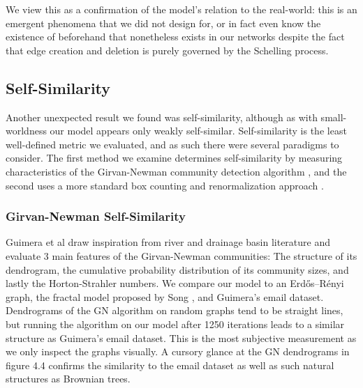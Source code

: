 \documentclass[12pt,twoside]{report}
\begin{document}
We view this as a confirmation of the model's relation to the real-world: this is an emergent phenomena that we did not design for, or in fact even know the existence of beforehand that nonetheless exists in our networks despite the fact that edge creation and deletion is purely governed by the Schelling process. \\

\subsection{Self-Similarity}

Another unexpected result we found was self-similarity, although as with small-worldness our model appears only weakly self-similar. Self-similarity is the least well-defined metric we evaluated, and as such there were several paradigms to consider. The first method we examine determines self-similarity by measuring characteristics of the Girvan-Newman community detection algorithm \cite{guimera2002self}, and the second uses a more standard box counting and renormalization approach \cite{song2007calculate}. \\

\subsubsection{Girvan-Newman Self-Similarity}

Guimera et al \cite{guimera2002self} draw inspiration from river and drainage basin literature and evaluate 3 main features of the Girvan-Newman communities: The structure of its dendrogram, the cumulative probability distribution of its community sizes, and lastly the Horton-Strahler numbers. We compare our model to an Erdős–Rényi graph, the fractal model proposed by Song \cite{song2006origins}, and Guimera's email dataset. \\

Dendrograms of the GN algorithm on random graphs tend to be straight lines, but running the algorithm on our model after 1250 iterations leads to a similar structure as Guimera's email dataset. This is the most subjective measurement as we only inspect the graphs visually. A cursory glance at the GN dendrograms in figure 4.4 confirms the similarity to the email dataset as well as such natural structures as Brownian trees. \\
\end{document}
